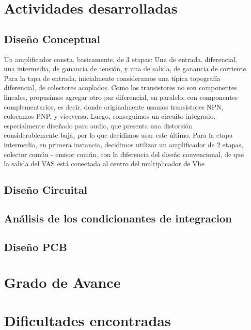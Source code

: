 \documentclass[a4paper,12pt,twoside]{article}
\begin{document}


\newpage
\vfill
\tableofcontents
\vfill

\newpage

\section{Actividades desarrolladas}

\subsection{Diseño Conceptual}

Un amplificador consta, basicamente, de 3 etapas: Una de entrada, diferencial, una intermedia, de ganancia de tensión, y una de salida, de ganancia de corriente.
Para la tapa de entrada, inicialmente consideramos una típica topografía diferencial, de colectores acoplados. Como los transistores no son componentes lineales, propusimos agregar otro par diferencial, en paralelo, con componentes complementarios, es decir, donde originalmente usamos transistores NPN, colocamos PNP, y viceversa.
Luego, conseguimos un circuito integrado, especialmente diseñado para audio, que presenta una distorsión considerablemente baja, por lo que decidimos usar este último.
Para la etapa intermedia, en primera instancia, decidimos utilizar un amplificador de 2 etapas, colector común - emisor común, con la diferencia del diseño convencional, de que la salida del VAS está conectada al centro del multiplicador de Vbe

\subsection{Diseño Circuital}

\subsection{Análisis de los condicionantes de integracion}

\subsection{Diseño PCB}

\section{Grado de Avance}

\section{Dificultades encontradas}
\end{document}
